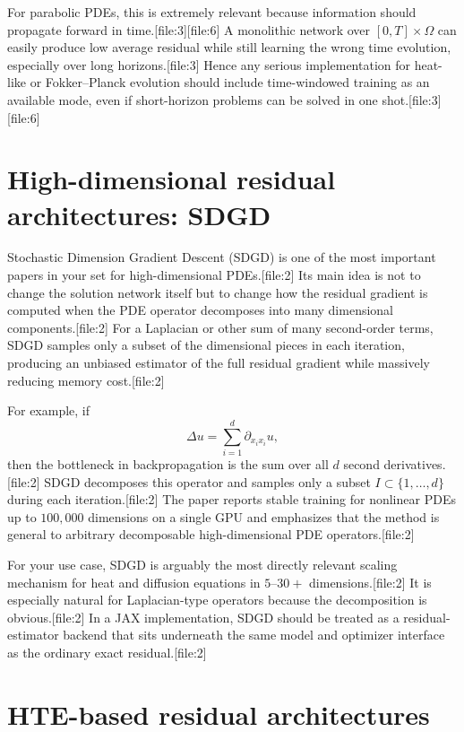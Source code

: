 \documentclass[11pt]{report}
\begin{document}
For parabolic PDEs, this is extremely relevant because information should propagate forward in time.[file:3][file:6]  
A monolithic network over \([0,T]\times \Omega\) can easily produce low average residual while still learning the wrong time evolution, especially over long horizons.[file:3]  
Hence any serious implementation for heat-like or Fokker--Planck evolution should include time-windowed training as an available mode, even if short-horizon problems can be solved in one shot.[file:3][file:6]

\section{High-dimensional residual architectures: SDGD}

Stochastic Dimension Gradient Descent (SDGD) is one of the most important papers in your set for high-dimensional PDEs.[file:2]  
Its main idea is not to change the solution network itself but to change how the residual gradient is computed when the PDE operator decomposes into many dimensional components.[file:2]  
For a Laplacian or other sum of many second-order terms, SDGD samples only a subset of the dimensional pieces in each iteration, producing an unbiased estimator of the full residual gradient while massively reducing memory cost.[file:2]

For example, if
\[
\Delta u = \sum_{i=1}^d \partial_{x_i x_i}u,
\]
then the bottleneck in backpropagation is the sum over all \(d\) second derivatives.[file:2]  
SDGD decomposes this operator and samples only a subset \(I\subset\{1,\dots,d\}\) during each iteration.[file:2]  
The paper reports stable training for nonlinear PDEs up to \(100{,}000\) dimensions on a single GPU and emphasizes that the method is general to arbitrary decomposable high-dimensional PDE operators.[file:2]

For your use case, SDGD is arguably the most directly relevant scaling mechanism for heat and diffusion equations in \(5\)–\(30+\) dimensions.[file:2]  
It is especially natural for Laplacian-type operators because the decomposition is obvious.[file:2]  
In a JAX implementation, SDGD should be treated as a residual-estimator backend that sits underneath the same model and optimizer interface as the ordinary exact residual.[file:2]

\section{HTE-based residual architectures}
\end{document}
